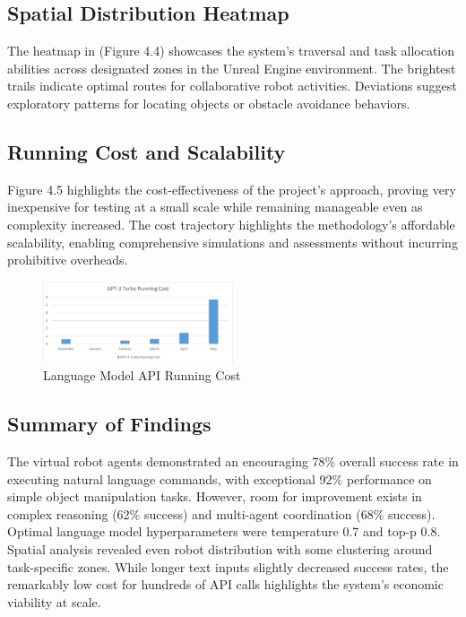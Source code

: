 \documentclass[pdflatex,sn-mathphys-num]{sn-jnl}%
\theoremstyle{thmstyleone}
\theoremstyle{thmstyletwo}%
\theoremstyle{thmstylethree}%
\begin{document}
\subsection{Spatial Distribution Heatmap}
The heatmap in (Figure 4.4) showcases the system's traversal and task allocation abilities across designated zones in the Unreal Engine environment.
The brightest trails indicate optimal routes for collaborative robot activities. Deviations suggest exploratory patterns for locating objects or obstacle avoidance behaviors.

\subsection{Running Cost and Scalability}
Figure 4.5 highlights the cost-effectiveness of the project's approach, proving very inexpensive for testing at a small scale while remaining manageable even as complexity increased. The cost trajectory highlights the methodology's affordable scalability, enabling comprehensive simulations and assessments without incurring prohibitive overheads.

\begin{figure}[H]
\centering
\includegraphics[width=0.5\textwidth]{figures/running_cost.png}
\caption{Language Model API Running Cost}\label{fig11}
\end{figure}


\subsection{Summary of Findings}
The virtual robot agents demonstrated an encouraging 78\% overall success rate in executing natural language commands, with exceptional 92\% performance on simple object manipulation tasks. However, room for improvement exists in complex reasoning (62\% success) and multi-agent coordination (68\% success). Optimal language model hyperparameters were temperature 0.7 and top-p 0.8. Spatial analysis revealed even robot distribution with some clustering around task-specific zones. While longer text inputs slightly decreased success rates, the remarkably low cost for hundreds of API calls highlights the system's economic viability at scale.
\end{document}
